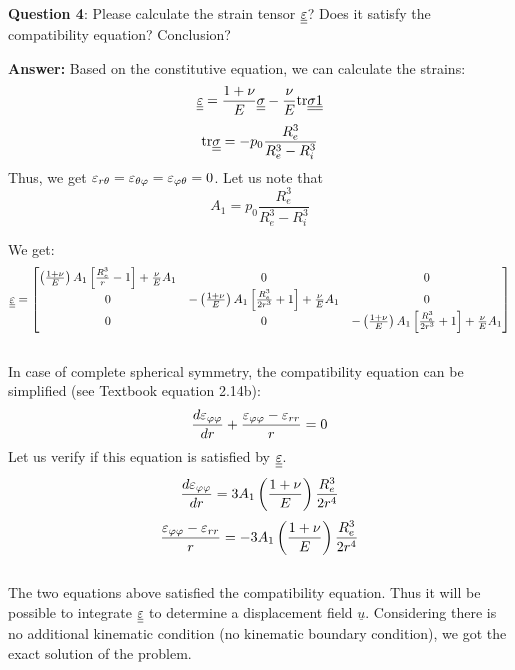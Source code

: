 \noindent \textbf{Question 4}: Please calculate the strain tensor $\underline{\underline{\varepsilon}}$? Does it satisfy the compatibility equation? Conclusion?

\textbf{Answer:} Based on the constitutive equation, we can calculate the strains:
\begin{equation}
\underline{\underline{\varepsilon}} = \frac{1+\nu}{E} \underline{\underline{\sigma}} - \frac{\nu}{E} \text{tr} \underline{\underline{\sigma}} \underline{\underline{1}}
\end{equation}
\begin{equation}
\text{tr}\underline{\underline{\sigma}} = -p_0 \frac{R_e^3}{R_e^3 - R_i^3}
\end{equation}
Thus, we get $\varepsilon_{r\theta} = \varepsilon_{\theta\varphi} = \varepsilon_{\varphi\theta} = 0$. Let us note that 
\begin{equation}
A_1 = p_0 \frac{R_e^3}{R_e^3 - R_i^3}
\end{equation}

We get:
\begin{equation}
\underline{\underline{\varepsilon}} =  \left[
\begin{matrix}
\left(\frac{1+\nu}{E}\right) A_1 \left[
\frac{R_e^3}{r} - 1 \right] + \frac{\nu}{E} A_1 & 0 & 0 \\
0 & -\left(\frac{1+\nu}{E}\right) A_1 \left[
\frac{R_e^3}{2r^3} + 1 \right] + \frac{\nu}{E} A_1 & 0 \\
0 & 0 & -\left(\frac{1+\nu}{E}\right) A_1 \left[
\frac{R_e^3}{2r^3} + 1 \right] + \frac{\nu}{E} A_1
\end{matrix}
\right]
\end{equation} \\

In case of complete spherical symmetry, the compatibility equation can be simplified (see Textbook equation 2.14b):
\begin{equation}
\frac{d\varepsilon_{\varphi\varphi}}{dr} + \frac{\varepsilon_{\varphi\varphi}- \varepsilon_{rr}}{r} = 0
\end{equation}
Let us verify if this equation is satisfied by $\underline{\underline{\varepsilon}}$.
\begin{equation}
\frac{d\varepsilon_{\varphi\varphi}}{dr} = 3A_1 \left(\frac{1+\nu}{E}\right) \frac{R_e^3}{2r^4}
\end{equation}
\begin{equation}
\frac{\varepsilon_{\varphi\varphi} - \varepsilon_{rr}}{r} = -3A_1 \left(\frac{1+\nu}{E}\right) \frac{R_e^3}{2r^4}
\end{equation} \\

The two equations above satisfied the compatibility equation. Thus it will be possible to integrate $\underline{\underline{\varepsilon}}$ to determine a displacement field $\underline{u}$. Considering there is no additional kinematic condition (no kinematic boundary condition), we got the exact solution of the problem.

